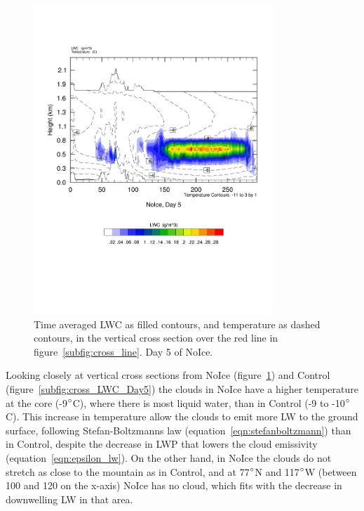\begin{figure}
\centering
\includegraphics[width=0.8\textwidth]{results/noice/crossSec_LWC_NoIce_Day5.pdf}
\caption{Time averaged LWC as filled contours, and temperature as dashed contours, in the vertical cross section over the red line in figure~\ref{subfig:cross_line}. Day 5 of NoIce.}
\label{fig:cross_LWC_r2Day5}
\end{figure}

Looking closely at vertical cross sections from NoIce (figure~\ref{fig:cross_LWC_r2Day5}) and Control (figure~\ref{subfig:cross_LWC_Day5}) the clouds in NoIce have a higher temperature at the core (-9$\degree$C), where there is most liquid water, than in Control (-9 to -10$\degree$C). This increase in temperature allow the clouds to emit more LW to the ground surface, following Stefan-Boltzmanns law (equation~\ref{eqn:stefanboltzmann}) than in Control, despite the decrease in LWP that lowers the cloud emissivity (equation~\ref{eqn:epsilon_lw}). On the other hand, in NoIce the clouds do not stretch as close to the mountain as in Control, and at 77$\degree$N and 117$\degree$W (between 100 and 120 on the x-axis) NoIce has no cloud, which fits with the decrease in downwelling LW in that area.

